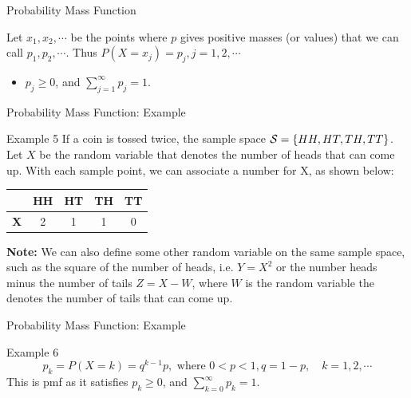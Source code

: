 \documentclass[aspectratio=169,xcolor=dvipsnames,svgnames,x11names,fleqn]{beamer}
\begin{document}
\begin{frame}[containsverbatim]{Probability Mass Function}
    
    
    Let $x_1, x_2, \cdots $ be the points where $p$ gives positive masses (or values) that we can call $p_1, p_2, \cdots$. Thus $P(X = x_j) = p_j, j = 1, 2, \cdots $
    \begin{itemize}
        \item $p_j \geq 0$, and $\sum_{j= 1}^\infty p_j = 1$.
    \end{itemize}

\end{frame}

\begin{frame}[containsverbatim]{Probability Mass Function: Example}
    
    
    \begin{exampleblock}{Example 5}
    If a coin is tossed twice, the sample space ${\mathcal S} = \{HH, HT, TH, TT\}$. Let $X$ be the random variable that denotes the number of heads that can come up. With each sample point, we can associate a number for X, as shown below:
    
    \begin{tabular}{|c|c|c|c|c|}
    \hline
     & \textbf{HH} & \textbf{HT} & \textbf{TH} & \textbf{TT} \\
    \hline
    \textbf{X} & 2 & 1 & 1 & 0 \\
    \hline
    \end{tabular}
    \newline
    \newline
    \textbf{Note:} We can also define some other random variable on the same sample space, such as the square of the number of heads, i.e. $Y = X^2$ or the number heads minus the number of tails $Z = X - W$, where $W$ is the random variable the denotes the number of tails that can come up.
    \end{exampleblock}

\end{frame}

\begin{frame}[containsverbatim]{Probability Mass Function: Example}
    
    
    \begin{exampleblock}{Example 6}
        \begin{equation}
            p_k = P(X = k) = q^{k-1} p, \text{~where~} 0 < p < 1 , q = 1 - p, \quad k = 1, 2, \cdots
        \end{equation}
        This is pmf as it satisfies $p_k \geq 0$, and $\sum_{k=0}^\infty p_k = 1.$
    \end{exampleblock}

\end{frame}
\end{document}

